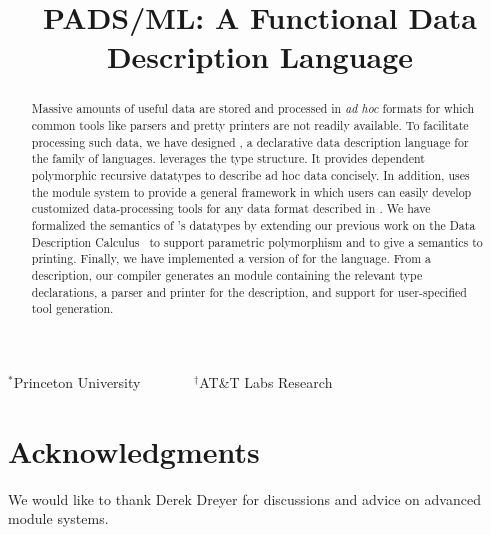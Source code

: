 \documentclass[nocopyrightspace]{sigplanconf}
\begin{document}
\title{PADS/ML: A Functional Data Description Language}
{$^\ast$Princeton University \ \ \ \ \ \ \ $^\dagger$AT\&T Labs Research}
 { \ \ \ \ }



\maketitle{}

\begin{abstract}  

  Massive amounts of useful data are stored and processed in
  \textit{ad hoc} formats for which common tools like parsers and
  pretty printers are not readily available.    To
  facilitate processing such data, we have designed \padsml{}, a
  declarative data description language for the \ml{} family of
  languages.  \padsml{} leverages the \ml{} type structure. It provides
  dependent polymorphic recursive datatypes to describe
  ad hoc data concisely.  In addition, \padsml{} uses the \ml{} module system to
  provide a general framework in which users can easily develop customized
  data-processing tools for any data format described in \padsml{}.
  We have formalized the semantics of \padsml{}'s datatypes by
  extending our previous work on the Data Description
  Calculus~\cite{fisher+:next700ddl} to support parametric polymorphism and to 
  give a semantics to printing. Finally, we
  have implemented a version of \padsml{} for the \ocaml{} language.
  From a \padsml{} description, our compiler generates an \ocaml{}
  module containing the relevant type declarations, a parser and printer
  for the description, and support for user-specified tool generation.

\end{abstract}















\section*{Acknowledgments}

We would like to thank Derek Dreyer for discussions and advice on
advanced module systems.



%


\end{document}
